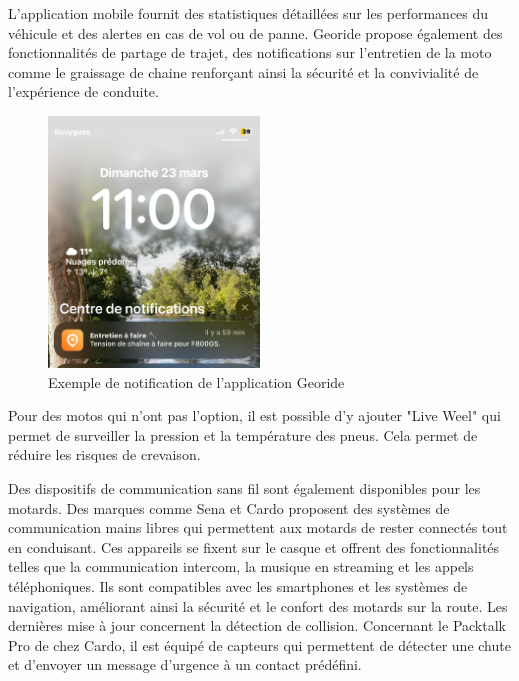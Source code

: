 L’application mobile fournit des statistiques détaillées sur les performances du véhicule et des alertes en cas de vol ou de panne. Georide propose également des fonctionnalités de partage de trajet, des notifications sur l'entretien de la moto comme le graissage de chaine renforçant ainsi la sécurité et la convivialité de l’expérience de conduite.
\begin{figure}[H]
    \centering
    \includegraphics[width=0.5\textwidth]{images/notification_georide.jpg} 
    \caption{Exemple de notification de l'application Georide}
\end{figure}
Pour des motos qui n'ont pas l'option, il est possible d'y ajouter "Live Weel" qui permet de surveiller la pression et la température des pneus. Cela permet de réduire les risques de crevaison.
\vspace{0.5cm}

Des dispositifs de communication sans fil sont également disponibles pour les motards. Des marques comme Sena et Cardo\cite{cardo} proposent des systèmes de communication mains libres qui permettent aux motards de rester connectés tout en conduisant. Ces appareils se fixent sur le casque et offrent des fonctionnalités telles que la communication intercom, la musique en streaming et les appels téléphoniques. Ils sont compatibles avec les smartphones et les systèmes de navigation, améliorant ainsi la sécurité et le confort des motards sur la route. Les dernières mise à jour concernent la détection de collision. Concernant le Packtalk Pro de chez Cardo, il est équipé de capteurs qui permettent de détecter une chute et d'envoyer un message d'urgence à un contact prédéfini.

